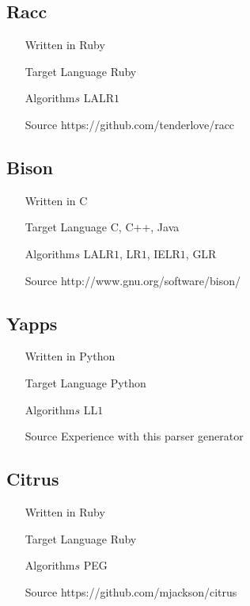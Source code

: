 \subsection{Racc}
\begin{itemize}
    \item[Written in]       Ruby
    \item[Target Language]  Ruby
    \item[Algorithm\(s\)]   LALR\(1\)
    \item[Source]           https://github.com/tenderlove/racc
\end{itemize}

\subsection{Bison}
\begin{itemize}
    \item[Written in] C
    \item[Target Language] C, C++, Java
    \item[Algorithm\(s\)]   LALR\(1\), LR\(1\), IELR\(1\), GLR
    \item[Source]           http://www.gnu.org/software/bison/
\end{itemize}

\subsection{Yapps}
\begin{itemize}
    \item[Written in] Python
    \item[Target Language] Python
    \item[Algorithm\(s\)]   LL\(1\)
    \item[Source]           Experience with this parser generator
\end{itemize}

\subsection{Citrus}
\begin{itemize}
    \item[Written in] Ruby
    \item[Target Language] Ruby
    \item[Algorithm\(s\)]   PEG
    \item[Source]           https://github.com/mjackson/citrus
\end{itemize}

